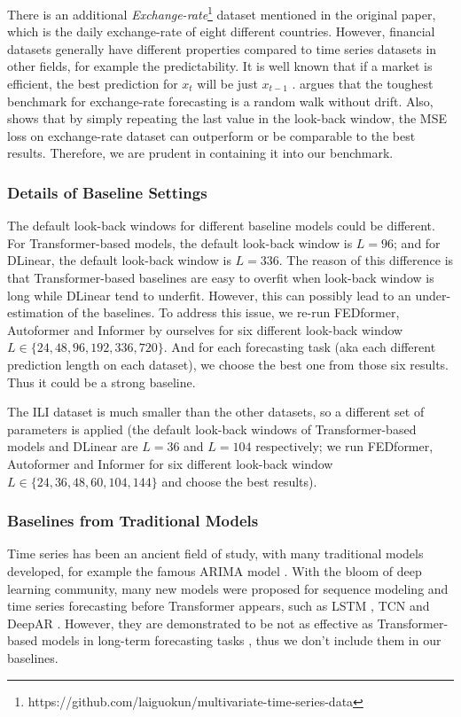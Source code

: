\documentclass{article} \usepackage{iclr2023_conference,times}
\begin{document}
There is an additional \textit{Exchange-rate}\footnote{https://github.com/laiguokun/multivariate-time-series-data} dataset mentioned in the original paper, which is the daily exchange-rate of eight different countries. However, financial datasets generally have different properties compared to time series datasets in other fields, for example the predictability. It is well known that if a market is efficient, the best prediction for $x_t$ will be just $x_{t-1}$ \citep{emh}. \citet{exchange} argues that the toughest benchmark for exchange-rate forecasting is a random walk without drift. Also, \citet{dlinear} shows that by simply repeating the last value in the look-back window, the MSE loss on exchange-rate dataset can outperform or be comparable to the best results. Therefore, we are prudent in containing it into our benchmark.

\subsubsection{Details of Baseline Settings}
\label{append::baseline}

The default look-back windows for different baseline models could be different. For Transformer-based models, the default look-back window is $L=96$; and for DLinear, the default look-back window is $L=336$. The reason of this difference is that Transformer-based baselines are easy to overfit when look-back window is long while DLinear tend to underfit. However, this can possibly lead to an under-estimation of the baselines. To address this issue, we re-run FEDformer, Autoformer and Informer by ourselves for six different look-back window $L\in \{24, 48, 96, 192, 336, 720\}$. And for each forecasting task (aka each different prediction length on each dataset), we choose the best one from those six results. Thus it could be a strong baseline.

The ILI dataset is much smaller than the other datasets, so a different set of parameters is applied (the default look-back windows of Transformer-based models and DLinear are $L=36$ and $L=104$ respectively; we run FEDformer, Autoformer and Informer for six different look-back window $L\in \{24, 36, 48, 60, 104, 144\}$ and choose the best results). 

\subsubsection{Baselines from Traditional Models}

Time series has been an ancient field of study, with many traditional models developed, for example the famous ARIMA model \citep{arima}. With the bloom of deep learning community, many new models were proposed for sequence modeling and time series forecasting before Transformer appears, such as LSTM \citep{lstm}, TCN \citep{tcn} and DeepAR \citep{deepar}. However, they are demonstrated to be not as effective as Transformer-based models in long-term forecasting tasks \citep{informer,autoformer}, thus we don't include them in our baselines.
\end{document}
